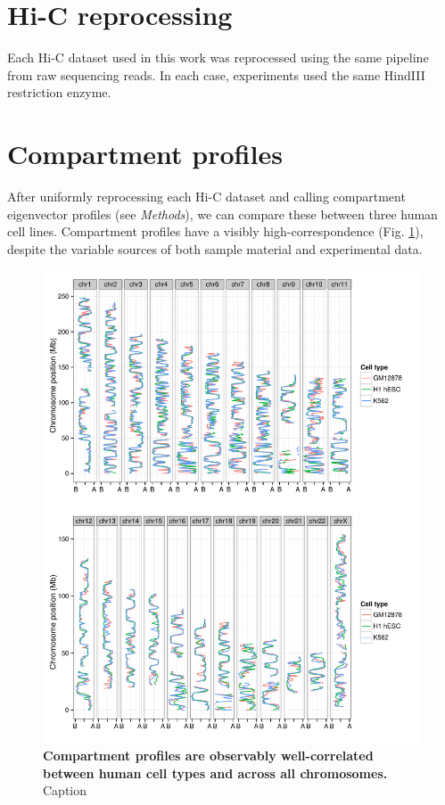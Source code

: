 \documentclass[a4paper,10pt,oneside]{book}
\begin{document}

\section{Hi-C reprocessing}

Each Hi-C dataset used in this work was reprocessed using the same pipeline from raw sequencing reads. In each case, experiments used the same HindIII restriction enzyme.


\section{Compartment profiles}

After uniformly reprocessing each Hi-C dataset and calling compartment eigenvector profiles (see \emph{Methods}), we can compare these between three human cell lines. Compartment profiles have a visibly high-correspondence (Fig. \ref{fig:wiggles}), despite the variable sources of both sample material and experimental data.

\begin{figure}
\begin{center}
\includegraphics[width=1.2\textwidth]{figs/wiggles.pdf}
\captionsetup{width=\textwidth}
\caption{
{\bf Compartment profiles are observably well-correlated between human cell types and across all chromosomes.}
Caption
}\label{fig:wiggles}
\end{center}
\end{figure} 
\end{document}
